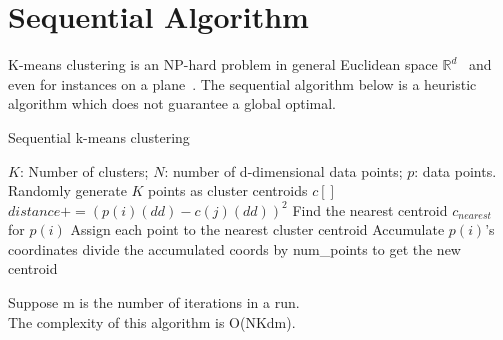 \section{Sequential Algorithm}
K-means clustering is an NP-hard problem in general Euclidean space 
$\mathbb{R}^d$~\cite{k-means-euclidean}
and even for instances on a plane~\cite{k-means-plane}. The sequential
algorithm below is a heuristic algorithm which does not guarantee
a global optimal. 

\begin{algorithm}
  \caption{Sequential k-means clustering} \label{seq}
  \begin{algorithmic}[1]
    \INPUT $K$: Number of clusters; $N$: number of d-dimensional data points; $p$: data points. 
    \State Randomly generate $K$ points as cluster centroids $c[]$
    \State $distance += (p(i)(dd) - c(j)(dd))^2$
    \EndFor
    \EndFor
    \State Find the nearest centroid $c_{nearest}$ for $p(i)$
    \State Assign each point to the nearest cluster centroid
    \State Accumulate $p(i)$'s coordinates
    \State divide the accumulated coords by num\_points to get the new centroid
    \EndFor
    \EndWhile
    \EndFunction
  \end{algorithmic}
\end{algorithm}

\vspace{5mm}
\noindent
Suppose m is the number of iterations in a run. \\
The complexity of this algorithm is O(NKdm). 
